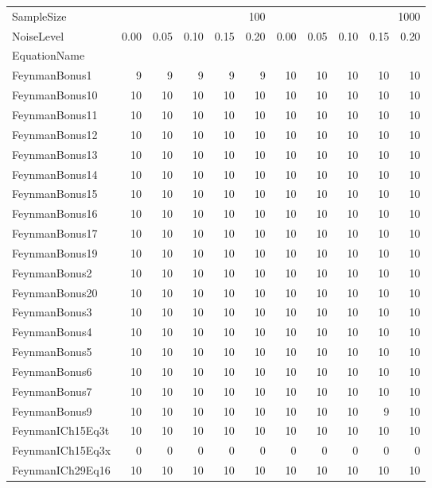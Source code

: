 \begin{tabular}{lrrrrrrrrrr}
\toprule
SampleSize & \multicolumn{5}{r}{100} & \multicolumn{5}{r}{1000} \\
NoiseLevel & 0.00 & 0.05 & 0.10 & 0.15 & 0.20 & 0.00 & 0.05 & 0.10 & 0.15 & 0.20 \\
EquationName &  &  &  &  &  &  &  &  &  &  \\
\midrule
FeynmanBonus1 & 9 & 9 & 9 & 9 & 9 & 10 & 10 & 10 & 10 & 10 \\
FeynmanBonus10 & 10 & 10 & 10 & 10 & 10 & 10 & 10 & 10 & 10 & 10 \\
FeynmanBonus11 & 10 & 10 & 10 & 10 & 10 & 10 & 10 & 10 & 10 & 10 \\
FeynmanBonus12 & 10 & 10 & 10 & 10 & 10 & 10 & 10 & 10 & 10 & 10 \\
FeynmanBonus13 & 10 & 10 & 10 & 10 & 10 & 10 & 10 & 10 & 10 & 10 \\
FeynmanBonus14 & 10 & 10 & 10 & 10 & 10 & 10 & 10 & 10 & 10 & 10 \\
FeynmanBonus15 & 10 & 10 & 10 & 10 & 10 & 10 & 10 & 10 & 10 & 10 \\
FeynmanBonus16 & 10 & 10 & 10 & 10 & 10 & 10 & 10 & 10 & 10 & 10 \\
FeynmanBonus17 & 10 & 10 & 10 & 10 & 10 & 10 & 10 & 10 & 10 & 10 \\
FeynmanBonus19 & 10 & 10 & 10 & 10 & 10 & 10 & 10 & 10 & 10 & 10 \\
FeynmanBonus2 & 10 & 10 & 10 & 10 & 10 & 10 & 10 & 10 & 10 & 10 \\
FeynmanBonus20 & 10 & 10 & 10 & 10 & 10 & 10 & 10 & 10 & 10 & 10 \\
FeynmanBonus3 & 10 & 10 & 10 & 10 & 10 & 10 & 10 & 10 & 10 & 10 \\
FeynmanBonus4 & 10 & 10 & 10 & 10 & 10 & 10 & 10 & 10 & 10 & 10 \\
FeynmanBonus5 & 10 & 10 & 10 & 10 & 10 & 10 & 10 & 10 & 10 & 10 \\
FeynmanBonus6 & 10 & 10 & 10 & 10 & 10 & 10 & 10 & 10 & 10 & 10 \\
FeynmanBonus7 & 10 & 10 & 10 & 10 & 10 & 10 & 10 & 10 & 10 & 10 \\
FeynmanBonus9 & 10 & 10 & 10 & 10 & 10 & 10 & 10 & 10 & 9 & 10 \\
FeynmanICh15Eq3t & 10 & 10 & 10 & 10 & 10 & 10 & 10 & 10 & 10 & 10 \\
FeynmanICh15Eq3x & 0 & 0 & 0 & 0 & 0 & 0 & 0 & 0 & 0 & 0 \\
FeynmanICh29Eq16 & 10 & 10 & 10 & 10 & 10 & 10 & 10 & 10 & 10 & 10 \\

\end{tabular}

